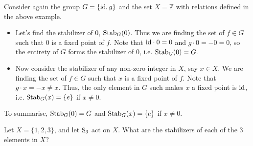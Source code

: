 \begin{example}
    Consider again the group $G = \{\mathrm{id}, g\}$ and the set $X = \mathbb{Z}$ with relations defined in the above example.
    \begin{itemize}
        \item Let's find the stabilizer of 0, $\mathrm{Stab}_{G}(0)$. Thus we are finding the set of $f \in G$ such that 0 is a fixed point of $f$. Note that $\mathrm{id} \cdot 0 = 0$ and $g \cdot 0 = -0 = 0$, so the entirety of $G$ forms the stabilizer of 0, i.e. $\mathrm{Stab}_{G}(0) = G$.
        \item Now consider the stabilizer of any non-zero integer in $X$, say $x \in X$. We are finding the set of $f \in G$ such that $x$ is a fixed point of $f$. Note that $g \cdot x = -x \neq x$. Thus, the only element in $G$ such makes $x$ a fixed point is $\mathrm{id}$, i.e. $\mathrm{Stab}_{G}(x) = \{e\}$ if $x \neq 0$.
    \end{itemize}
    To summarise, $\mathrm{Stab}_{G}(0) = G$ and $\mathrm{Stab}_{G}(x) = \{e\}$ if $x \neq 0$.
\end{example}

\begin{exercise}
    Let $X = \{1, 2, 3\}$, and let $\mathrm{S}_{3}$ act on $X$. What are the stabilizers of each of the 3 elements in $X$?
\end{exercise}

